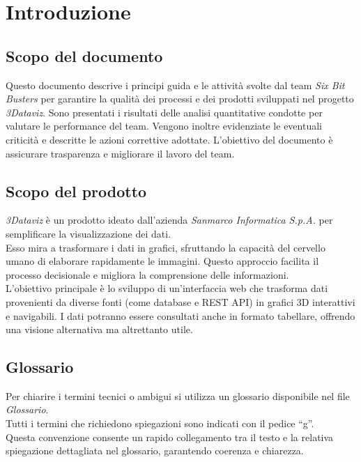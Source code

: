     \section{Introduzione}
    \subsection{Scopo del documento}
        Questo documento descrive i principi guida e le attività svolte dal team \textit{Six Bit Busters} per garantire la qualità dei processi e dei prodotti sviluppati nel progetto \textit{3Dataviz}.  
        Sono presentati i risultati delle analisi quantitative condotte per valutare le performance del team. Vengono inoltre evidenziate le eventuali criticità e descritte le azioni correttive adottate.
        L'obiettivo del documento è assicurare trasparenza e migliorare il lavoro del team.
        
    \subsection{Scopo del prodotto}
        \textit{3Dataviz} è un prodotto ideato dall'azienda \textit{Sanmarco Informatica S.p.A.} per semplificare la visualizzazione dei dati.\\
        Esso mira a trasformare i dati in grafici, sfruttando la capacità del cervello umano di elaborare rapidamente le immagini. 
        Questo approccio facilita il processo decisionale e migliora la comprensione delle informazioni.\\
        L’obiettivo principale è lo sviluppo di un’interfaccia web che trasforma dati provenienti da diverse fonti (come database e REST API) in grafici 3D interattivi e navigabili. 
        I dati potranno essere consultati anche in formato tabellare, offrendo una visione alternativa ma altrettanto utile.  
        
    \subsection{Glossario}
        Per chiarire i termini tecnici o ambigui si utilizza un glossario disponibile nel file \textit{Glossario}.\\
        Tutti i termini che richiedono spiegazioni sono indicati con il pedice “g”. \\
        Questa convenzione consente un rapido collegamento tra il testo e la relativa spiegazione dettagliata nel glossario, garantendo coerenza e chiarezza.

